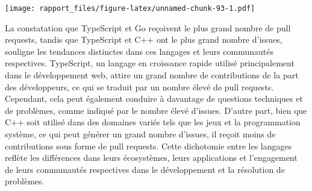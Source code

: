 \documentclass[
]{article}
\newenvironment{Shaded}{\begin{snugshade}}{\end{snugshade}}
\newcommand{\AttributeTok}[1]{\textcolor[rgb]{0.13,0.29,0.53}{#1}}
\newcommand{\CommentTok}[1]{\textcolor[rgb]{0.56,0.35,0.01}{\textit{#1}}}
\newcommand{\DecValTok}[1]{\textcolor[rgb]{0.00,0.00,0.81}{#1}}
\newcommand{\FunctionTok}[1]{\textcolor[rgb]{0.13,0.29,0.53}{\textbf{#1}}}
\newcommand{\NormalTok}[1]{#1}
\newcommand{\SpecialCharTok}[1]{\textcolor[rgb]{0.81,0.36,0.00}{\textbf{#1}}}
\newcommand{\StringTok}[1]{\textcolor[rgb]{0.31,0.60,0.02}{#1}}
\begin{document}
\begin{Shaded}
\end{Shaded}

\texttt{[image: rapport\_files/figure-latex/unnamed-chunk-93-1.pdf]}

La constatation que TypeScript et Go reçoivent le plus grand nombre de
pull requests, tandis que TypeScript et C++ ont le plus grand nombre
d'issues, souligne les tendances distinctes dans ces langages et leurs
communautés respectives. TypeScript, un langage en croissance rapide
utilisé principalement dans le développement web, attire un grand nombre
de contributions de la part des développeurs, ce qui se traduit par un
nombre élevé de pull requests. Cependant, cela peut également conduire à
davantage de questions techniques et de problèmes, comme indiqué par le
nombre élevé d'issues. D'autre part, bien que C++ soit utilisé dans des
domaines variés tels que les jeux et la programmation système, ce qui
peut générer un grand nombre d'issues, il reçoit moins de contributions
sous forme de pull requests. Cette dichotomie entre les langages reflète
les différences dans leurs écosystèmes, leurs applications et
l'engagement de leurs communautés respectives dans le développement et
la résolution de problèmes.
\end{document}
